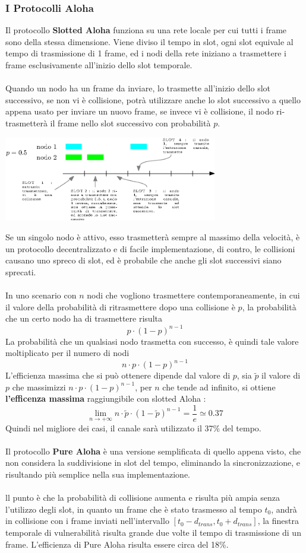 \documentclass[12pt, letterpaper]{article}
\newcommand{\acc}{\\\hphantom{}\\}
\begin{document}
\subsubsection{I Protocolli Aloha}
Il protocollo \textbf{Slotted Aloha} funziona su una rete locale per cui tutti i frame sono della stessa dimensione. Viene 
diviso il tempo in slot, ogni slot equivale al tempo di trasmissione di 1 frame, ed i nodi della rete iniziano a trasmettere 
i frame esclusivamente all'inizio dello slot temporale.\acc 
Quando un nodo ha un frame da inviare, lo trasmette all'inizio dello slot successivo, se non vi è collisione, 
potrà utilizzare anche lo slot successivo a quello appena usato per inviare un nuovo frame, se invece vi è 
collisione, il nodo ri-trasmetterà il frame nello slot successivo con probabilità $p$.\begin{center}
    \includegraphics[width=0.7\textwidth ]{images/slottedAloha.eps}
\end{center} 
Se un singolo nodo è attivo, esso trasmetterà sempre al massimo della velocità, è un protocollo decentralizzato 
e di facile implementazione, di contro, le collisioni causano uno spreco di slot, ed è probabile che anche gli slot 
successivi siano sprecati.\acc 
In uno scenario con $n$ nodi che vogliono trasmettere contemporaneamente, in cui il valore della probabilità 
di ritrasmettere dopo una collisione è $p$, la probabilità che un certo nodo ha di trasmettere risulta 
$$ p\cdot (1-p)^{n-1} $$
La probabilità che un qualsiasi nodo trasmetta con successo, è quindi tale valore moltiplicato per il numero di nodi 
$$ n\cdot p\cdot (1-p)^{n-1}  $$
L'efficienza massima che si può ottenere dipende dal valore di $p$, sia $\tilde p$ il valore di $p$ che 
massimizzi $ n\cdot p\cdot (1-p)^{n-1} $, per $n$ che tende ad infinito, si ottiene \textbf{l'efficenza massima} 
raggiungibile con slotted Aloha : $$\lim_{n\rightarrow +\infty}  n\cdot\tilde p\cdot (1-\tilde p)^{n-1} = \dfrac{1}{e}\simeq 0.37 $$
Quindi nel migliore dei casi, il canale sarà utilizzato il 37\% del tempo.\acc 
Il protocollo \textbf{Pure Aloha} è una versione semplificata di quello appena visto, che non considera la suddivisione 
in slot del tempo, eliminando la sincronizzazione, e risultando più semplice nella sua implementazione. \acc ll punto è che la probabilità di collisione 
aumenta e risulta più ampia senza l'utilizzo degli slot, in quanto un frame che è stato trasmesso al tempo $t_0$, andrà in 
collisione con i frame inviati nell'intervallo $[t_0-d_{trans},t_0+d_{trans}]$, la finestra temporale di vulnerabilità risulta 
grande due volte il tempo di trasmissione di un frame. L'efficienza di Pure Aloha risulta essere circa del 18\%.
\end{document}
